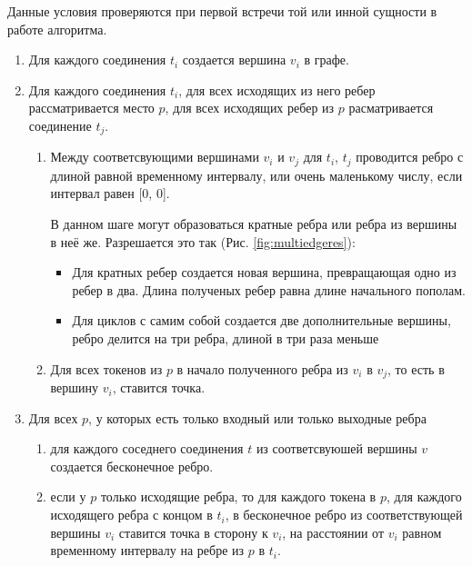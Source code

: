 \documentclass{../TechDoc}
\begin{document}
		Данные условия проверяются при первой встречи той или инной сущности в работе алгоритма.
		
		\begin{enumerate}
			\item Для каждого соединения $t_i$ создается вершина $v_i$ в графе.
			\item Для каждого соединения $t_i$, для всех исходящих из него ребер рассматривается место $p$, для всех исходящих ребер из $p$ расматривается соединение $t_j$.
			\begin{enumerate}
				\item Между соответсвующими вершинами $v_i$ и $v_j$ для $t_i$, $t_j$ проводится ребро с длиной равной временному интервалу, или очень маленькому числу, если интервал равен [0, 0].
				
				В данном шаге могут образоваться кратные ребра или ребра из вершины в неё же. Разрешается это так (Рис. \ref{fig:multiedgeres}):
				\begin{itemize}
					\item Для кратных ребер создается новая вершина, превращающая одно из ребер в два. Длина полученых ребер равна длине начального пополам.
					\item Для циклов с самим собой создается две дополнительные вершины, ребро делится на три ребра, длиной в три раза меньше
				\end{itemize}
				\item Для всех токенов из $p$ в начало полученного ребра из $v_i$ в $v_j$, то есть в вершину $v_i$, ставится точка.
			\end{enumerate}
			\item Для всех $p$, у которых есть только входный или только выходные ребра
			\begin{enumerate}
				\item для каждого соседнего соединения $t$ из соответсвуюшей вершины $v$ создается бесконечное ребро. 
				\item если у $p$ только исходящие ребра, то для каждого токена в $p$, для каждого исходящего ребра с концом в $t_i$, в бесконечное ребро из соответствующей вершины $v_i$ ставится точка в сторону к $v_i$, на расстоянии от $v_i$ равном временному интервалу на ребре из $p$ в $t_i$.  
			\end{enumerate}
		\end{enumerate}
	
\end{document}

